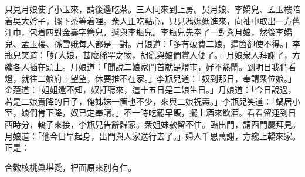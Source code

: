 只見月娘使了小玉來，請後邊吃茶。三人同來到上房。吳月娘、李嬌兒、孟玉樓陪着吳大妗子，擺下茶等着哩。衆人正吃點心，只見馮媽媽進來，向袖中取出一方舊汗巾，包着四對金壽字簪兒，遞與李瓶兒。李瓶兒先奉了一對與月娘，然後李嬌兒、孟玉樓、孫雪娥每人都是一對。月娘道：「多有破費二娘，這箇卻使不得。」李瓶兒笑道：「好大娘，甚麼稀罕之物，胡亂與娘們賞人便了。」月娘衆人拜謝了，方纔各人插在頭上。月娘道：「聞說二娘家門首就是燈市，好不熱鬧。到明日我們看燈，就往二娘府上望望，休要推不在家。」李瓶兒道：「奴到那日，奉請衆位娘。」金蓮道：「姐姐還不知，奴打聽來，這十五日是二娘生日。」月娘道：「今日說過，若是二娘貴降的日子，俺姊妹一箇也不少，來與二娘祝壽。」李瓶兒笑道：「蝸居小室，娘們肯下降，奴已定奉請。」不一時吃罷早飯，擺上酒來飲酒。看看留連到日西時分，轎子來接，李瓶兒告辭歸家。衆姐妹款留不住。臨出門，請西門慶拜見。月娘道：「他今日早起身，出門與人家送行去了。」婦人千恩萬謝，方纔上轎來家。正是：

\begin{myquote}
合歡核桃眞堪愛，裡面原來別有仁。
\end{myquote}


